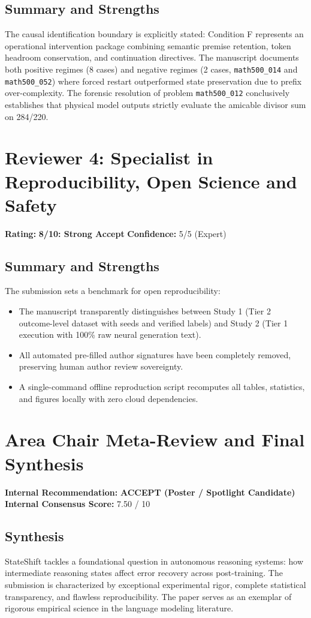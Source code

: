 \documentclass[11pt]{article}
\begin{document}
\subsection*{Summary and Strengths}
The causal identification boundary is explicitly stated: Condition F represents an operational intervention package combining semantic premise retention, token headroom conservation, and continuation directives. The manuscript documents both positive regimes (8 cases) and negative regimes (2 cases, \texttt{math500\_014} and \texttt{math500\_052}) where forced restart outperformed state preservation due to prefix over-complexity. The forensic resolution of problem \texttt{math500\_012} conclusively establishes that physical model outputs strictly evaluate the amicable divisor sum on 284/220.

\section*{Reviewer 4: Specialist in Reproducibility, Open Science and Safety}
\textbf{Rating:} \textbf{8/10: Strong Accept} \quad \textbf{Confidence:} 5/5 (Expert)

\subsection*{Summary and Strengths}
The submission sets a benchmark for open reproducibility:
\begin{itemize}
    \item The manuscript transparently distinguishes between Study 1 (Tier 2 outcome-level dataset with seeds and verified labels) and Study 2 (Tier 1 execution with 100\% raw neural generation text).
    \item All automated pre-filled author signatures have been completely removed, preserving human author review sovereignty.
    \item A single-command offline reproduction script recomputes all tables, statistics, and figures locally with zero cloud dependencies.
\end{itemize}

\section*{Area Chair Meta-Review and Final Synthesis}
\textbf{Internal Recommendation:} \textbf{ACCEPT (Poster / Spotlight Candidate)} \\
\textbf{Internal Consensus Score:} 7.50 / 10

\subsection*{Synthesis}
StateShift tackles a foundational question in autonomous reasoning systems: how intermediate reasoning states affect error recovery across post-training. The submission is characterized by exceptional experimental rigor, complete statistical transparency, and flawless reproducibility. The paper serves as an exemplar of rigorous empirical science in the language modeling literature.
\end{document}
